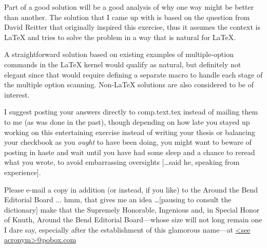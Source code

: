     Part of a good solution will be a good analysis of why one way 
might be better than another. The solution that I came up with 
is based on the question from David Reitter that originally 
inspired this exercise, thus it assumes the context is LaTeX and 
tries to solve the problem in a way that is natural for LaTeX. 

    A straightforward solution based on existing examples of 
multiple-option commands in the LaTeX kernel would qualify as 
natural, but definitely not elegant since that would require 
defining a separate macro to handle each stage of the multiple 
option scanning. Non-LaTeX solutions are also considered to be 
of interest. 


    I suggest posting your answers directly to comp.text.tex instead 
of mailing them to me (as was done in the past), though 
depending on how late you stayed up working on this entertaining 
exercise instead of writing your thesis or balancing your 
checkbook as you \emph{ought} to have been doing, you might want to 
beware of posting in haste and wait until you have had some 
sleep and a chance to reread what you wrote, to avoid 
embarrassing oversights [\ldots said he, speaking from experience]. 

    Please e-mail a copy in addition (or instead, if you like) to the 
Around the Bend Editorial Board ... hmm, that gives me an idea \ldots [pausing to 
consult the dictionary] make that the Supremely Honorable, 
Ingenious and, in Special Honor of Knuth, Around the Bend Editorial
Board---whose size will not long remain one I dare say, 
especially after the establishment of this glamorous name---at 
\url{<see acronym>@pobox.com}


